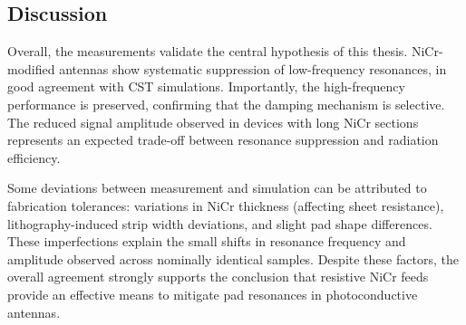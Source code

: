 \subsection{Discussion}
Overall, the measurements validate the central hypothesis of this thesis. NiCr-modified antennas show systematic suppression of low-frequency resonances, in good agreement with CST simulations. Importantly, the high-frequency performance is preserved, confirming that the damping mechanism is selective. The reduced
signal amplitude observed in devices with long NiCr sections represents an expected trade-off between resonance suppression and radiation efficiency.

\noindent
Some deviations between measurement and simulation can be attributed to fabrication tolerances: variations in
NiCr thickness (affecting sheet resistance), lithography-induced strip width deviations, and slight pad shape
differences. These imperfections explain the small shifts in resonance frequency and amplitude observed across
nominally identical samples. Despite these factors, the overall agreement strongly supports the conclusion that
resistive NiCr feeds provide an effective means to mitigate pad resonances in photoconductive antennas.
